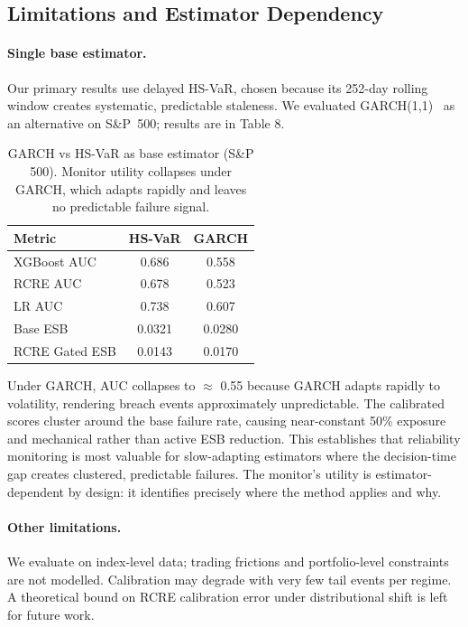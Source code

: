 \documentclass[sigconf]{acmart}
\begin{document}
\subsection{Limitations and Estimator Dependency}
\label{sec:limitations}

\paragraph{Single base estimator.} Our primary results use delayed HS-VaR, chosen because its 252-day rolling window creates systematic, predictable staleness. We evaluated GARCH(1,1)~\cite{bollerslev1986generalized,engle1982arch} as an alternative on S\&P~500; results are in Table 8.

\begin{table}[t]
\caption{GARCH vs HS-VaR as base estimator (S\&P 500). Monitor utility collapses under GARCH, which adapts rapidly and leaves no predictable failure signal.}
\label{tab:garch}
\small
\begin{tabular}{lcc}
\toprule
\textbf{Metric} & \textbf{HS-VaR} & \textbf{GARCH} \\
\midrule
XGBoost AUC    & 0.686 & 0.558 \\
RCRE AUC       & 0.678 & 0.523 \\
LR AUC         & 0.738 & 0.607 \\
Base ESB       & 0.0321 & 0.0280 \\
RCRE Gated ESB & 0.0143 & 0.0170 \\
\bottomrule
\end{tabular}
\end{table}

Under GARCH, AUC collapses to $\approx$ 0.55 because GARCH adapts rapidly to volatility, rendering breach events approximately unpredictable. The calibrated scores cluster around the base failure rate, causing near-constant 50\% exposure and mechanical rather than active ESB reduction. This establishes that reliability monitoring is most valuable for slow-adapting estimators where the decision-time gap creates clustered, predictable failures. The monitor's utility is estimator-dependent by design: it identifies precisely where the method applies and why.

\paragraph{Other limitations.} We evaluate on index-level data; trading frictions and portfolio-level constraints are not modelled. Calibration may degrade with very few tail events per regime. A theoretical bound on RCRE calibration error under distributional shift is left for future work.
\end{document}
